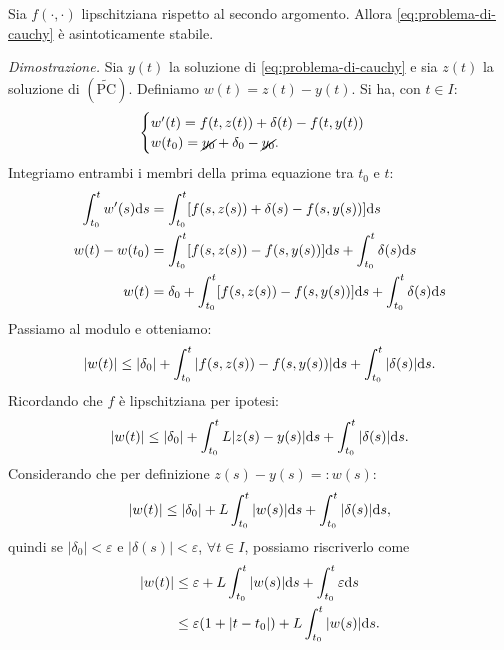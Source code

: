 \begin{theorem}
[Stabilità]
Sia $f( \cdot ,\cdot )$ lipschitziana rispetto al secondo argomento. Allora \eqref{eq:problema-di-cauchy} è asintoticamente stabile.
\label{thm:stabilita-PC}
\end{theorem}

\textit{Dimostrazione.}
Sia $y(t)$ la soluzione di \eqref{eq:problema-di-cauchy} e sia $z(t)$ la soluzione di $(\widetilde{\text{PC}})$. Definiamo $w(t) =z(t) -y(t)$. Si ha, con $t\in I$:
\begin{equation*}
\begin{cases}
w'(t) =f( t,z(t)) +\delta (t) -f( t,y(t))\\
w( t_{0}) =\cancel{y_{0}} +\delta _{0} -\cancel{y_{0}}.
\end{cases}
\end{equation*}
Integriamo entrambi i membri della prima equazione tra $t_{0}$ e $t$:
\begin{align*}
\int\nolimits ^{t}_{t_{0}} w'(s) \mathrm d s & =\int\nolimits ^{t}_{t_{0}}[ f( s,z(s)) +\delta (s) -f( s,y(s))] \mathrm d s\\
w(t) -w( t_{0}) & =\int\nolimits ^{t}_{t_{0}}[ f( s,z(s)) -f( s,y(s))] \mathrm d s+\int\nolimits ^{t}_{t_{0}} \delta (s) \mathrm d s\\
w(t) & =\delta _{0} +\int\nolimits ^{t}_{t_{0}}[ f( s,z(s)) -f( s,y(s))] \mathrm d s+\int\nolimits ^{t}_{t_{0}} \delta (s) \mathrm d s
\end{align*}
Passiamo al modulo e otteniamo:
\begin{equation*}
| w(t)| \leq | \delta _{0}| +\int\nolimits ^{t}_{t_{0}}| f( s,z(s)) -f( s,y(s))| \mathrm d s+\int\nolimits ^{t}_{t_{0}}| \delta (s)| \mathrm d s.
\end{equation*}
Ricordando che $f$ è lipschitziana per ipotesi:
\begin{equation*}
| w(t)| \leq | \delta _{0}| +\int\nolimits ^{t}_{t_{0}} L| z(s) -y(s)| \mathrm d s+\int\nolimits ^{t}_{t_{0}}| \delta (s)| \mathrm d s.
\end{equation*}
Considerando che per definizione $z(s) -y(s) =:w(s)$:
\begin{equation*}
| w(t)| \leq | \delta _{0}| +L\int\nolimits ^{t}_{t_{0}}| w(s)| \mathrm d s+\int\nolimits ^{t}_{t_{0}}| \delta (s)| \mathrm d s,
\end{equation*}
quindi se $| \delta _{0}| < \varepsilon $ e $| \delta (s)| < \varepsilon $, $\forall t\in I$, possiamo riscriverlo come
\begin{align*}
| w(t)|  & \leq \varepsilon +L\int\nolimits ^{t}_{t_{0}}| w(s)| \mathrm d s+\int\nolimits ^{t}_{t_{0}} \varepsilon \mathrm d s\\
 & \leq \varepsilon ( 1+| t-t_{0}| ) +L\int\nolimits ^{t}_{t_{0}}| w(s)| \mathrm d s.
\end{align*}

